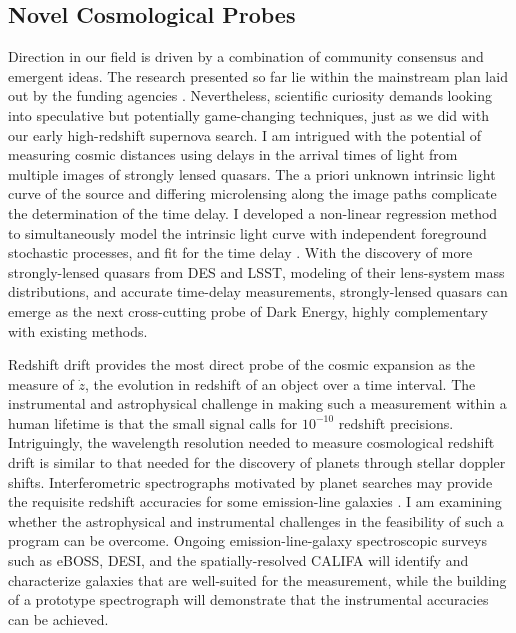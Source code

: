 \documentclass[12pt]{article}
\begin{document}
\subsection{Novel Cosmological Probes}
Direction in our field is driven by a combination of community consensus and emergent ideas.
The research presented so far  lie  within the
mainstream plan laid out by the funding agencies
\cite{2013arXiv1309.5386D,2015APh....63....2K}.
Nevertheless, scientific curiosity demands looking into speculative but potentially game-changing
techniques, just as we did with our early high-redshift supernova search.
I am intrigued with the potential of measuring cosmic distances using delays in the arrival times of light from multiple images
of strongly lensed quasars.  The a priori unknown intrinsic light curve of the source and differing microlensing
along the image paths complicate the determination of the time delay.  I developed a
non-linear regression method to simultaneously model the intrinsic light curve with independent foreground
stochastic processes, and fit for the time delay \cite{2013PhRvD..87l3512H}.  With the discovery of more 
strongly-lensed quasars from DES and LSST, modeling of their lens-system mass distributions, and accurate
time-delay measurements, strongly-lensed
quasars can emerge as the next cross-cutting probe of Dark Energy, highly complementary with existing methods.

Redshift drift provides the most direct  probe
of the cosmic expansion as the measure of $\dot{z}$, the evolution in redshift of an object over a time interval.
The instrumental
and astrophysical challenge
in making such a measurement within a human lifetime
is that the small signal calls for $10^{-10}$ redshift precisions.  Intriguingly, the wavelength resolution needed to measure
cosmological redshift drift is similar to that needed for the discovery of planets through stellar doppler shifts.
Interferometric spectrographs motivated by planet searches may provide the
requisite redshift accuracies for some emission-line galaxies
\cite{2015APh....62..195K}.
I  am examining whether the astrophysical and instrumental challenges in the feasibility of such a program can be overcome.
Ongoing  emission-line-galaxy  spectroscopic surveys such
as eBOSS, DESI, and the spatially-resolved CALIFA will identify and characterize
galaxies that are well-suited for the measurement, while the building of a prototype spectrograph will demonstrate that the
instrumental  accuracies can be achieved.
\end{document}
